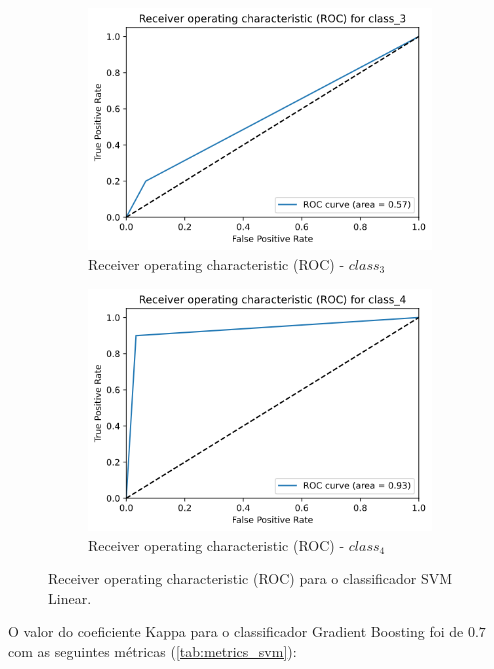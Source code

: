 \documentclass[
	article,			%
	11pt,				%
	oneside,			%
	a4paper,			%
	english,			%
	brazil,				%
	sumario=tradicional
	]{abntex2}
\begin{document}
\begin{figure}
\begin{subfigure}[b]{0.475\textwidth}
    \includegraphics[scale=0.375]{fig/svm_roc3.png}
    \caption{Receiver operating characteristic (ROC) - $class_3$}
    \label{fig:svm_roc3}
    \end{subfigure}
    \hfill
    \begin{subfigure}[b]{0.475\textwidth}
    \centering
    \includegraphics[scale=0.375]{fig/svm_roc4.png}
    \caption{Receiver operating characteristic (ROC) - $class_4$}
    \label{fig:svm_roc4}
    \end{subfigure}
    \caption{Receiver operating characteristic (ROC) para o classificador SVM Linear.}
    \label{svm_roc}
\end{figure}

O valor do coeficiente Kappa para o classificador Gradient Boosting foi de $0.7$ com as seguintes métricas (\ref{tab:metrics_svm}):
\end{document}
